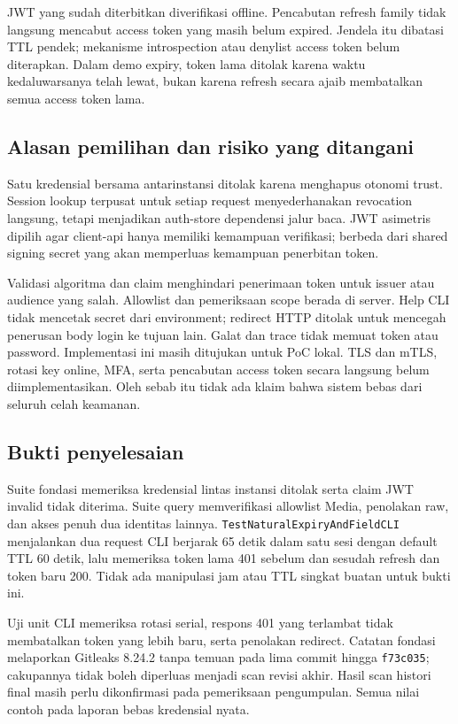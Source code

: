 JWT yang sudah diterbitkan diverifikasi offline. Pencabutan refresh family tidak langsung mencabut access token yang masih belum expired. Jendela itu dibatasi TTL pendek; mekanisme introspection atau denylist access token belum diterapkan. Dalam demo expiry, token lama ditolak karena waktu kedaluwarsanya telah lewat, bukan karena refresh secara ajaib membatalkan semua access token lama.

\subsection{Alasan pemilihan dan risiko yang ditangani}
Satu kredensial bersama antarinstansi ditolak karena menghapus otonomi trust. Session lookup terpusat untuk setiap request menyederhanakan revocation langsung, tetapi menjadikan auth-store dependensi jalur baca. JWT asimetris dipilih agar client-api hanya memiliki kemampuan verifikasi; berbeda dari shared signing secret yang akan memperluas kemampuan penerbitan token.

Validasi algoritma dan claim menghindari penerimaan token untuk issuer atau audience yang salah. Allowlist dan pemeriksaan scope berada di server. Help CLI tidak mencetak secret dari environment; redirect HTTP ditolak untuk mencegah penerusan body login ke tujuan lain. Galat dan trace tidak memuat token atau password. Implementasi ini masih ditujukan untuk PoC lokal. TLS dan mTLS, rotasi key online, MFA, serta pencabutan access token secara langsung belum diimplementasikan. Oleh sebab itu tidak ada klaim bahwa sistem bebas dari seluruh celah keamanan.

\subsection{Bukti penyelesaian}
Suite fondasi memeriksa kredensial lintas instansi ditolak serta claim JWT invalid tidak diterima. Suite query memverifikasi allowlist Media, penolakan raw, dan akses penuh dua identitas lainnya. \texttt{TestNaturalExpiryAndFieldCLI} menjalankan dua request CLI berjarak 65 detik dalam satu sesi dengan default TTL 60 detik, lalu memeriksa token lama 401 sebelum dan sesudah refresh dan token baru 200. Tidak ada manipulasi jam atau TTL singkat buatan untuk bukti ini.

Uji unit CLI memeriksa rotasi serial, respons 401 yang terlambat tidak membatalkan token yang lebih baru, serta penolakan redirect. Catatan fondasi melaporkan Gitleaks 8.24.2 tanpa temuan pada lima commit hingga \texttt{f73c035}; cakupannya tidak boleh diperluas menjadi scan revisi akhir. Hasil scan histori final masih perlu dikonfirmasi pada pemeriksaan pengumpulan. Semua nilai contoh pada laporan bebas kredensial nyata.
